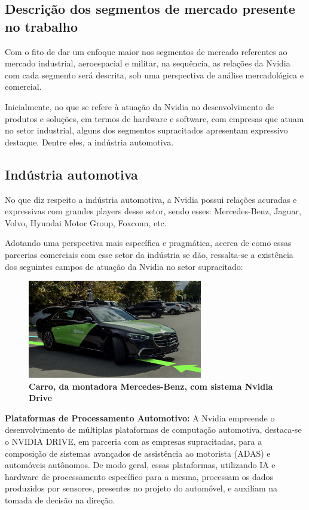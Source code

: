 \documentclass[conference]{IEEEtran}
\begin{document}
\subsection{Descrição dos segmentos de mercado presente no trabalho}
\par Com o fito de dar um enfoque maior nos segmentos de mercado referentes ao mercado industrial, aeroespacial e militar, na sequência, as relações da Nvidia com cada segmento será descrita, sob uma perspectiva de análise mercadológica e comercial.

\par Inicialmente, no que se refere à atuação da Nvidia no desenvolvimento de produtos e soluções, em termos de hardware e software, com empresas que atuam no setor industrial, alguns dos segmentos supracitados apresentam expressivo destaque. Dentre eles, a indústria automotiva.

\subsection{Indústria automotiva}
\par No que diz respeito a indústria automotiva, a Nvidia possui relações acuradas e expressivas com grandes players desse setor, sendo esses: Mercedes-Benz, Jaguar, Volvo, Hyundai Motor Group, Foxconn, etc.
\par Adotando uma perspectiva mais específica e pragmática, acerca de como essas parcerias comerciais com esse setor da indústria se dão, ressalta-se a existência dos seguintes campos de atuação da Nvidia no setor supracitado: 

\begin{figure}[h]
\centerline{\includegraphics[width = 3.0in]{automovel.jpg}}
\caption{\textbf{Carro, da montadora Mercedes-Benz, com sistema Nvidia Drive}}
\label{figAM9300}
\end{figure}

\par \textbf{Plataformas de Processamento Automotivo:} A Nvidia empreende o desenvolvimento de múltiplas plataformas de computação automotiva, destaca-se o NVIDIA DRIVE, em parceria com as empresas supracitadas, para a composição de sistemas avançados de assistência ao motorista (ADAS) e automóveis autônomos. De modo geral, essas plataformas, utilizando IA e hardware de processamento específico para a mesma, processam os dados produzidos por sensores, presentes no projeto do automóvel, e auxiliam na tomada de decisão na direção.
\end{document}

